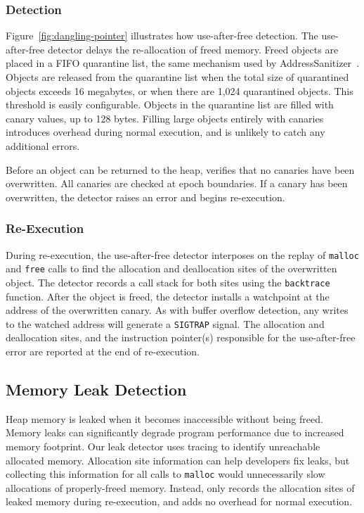 \subsubsection*{Detection}

Figure~\ref{fig:dangling-pointer} illustrates how use-after-free detection. The use-after-free detector delays the re-allocation of freed memory. Freed objects are placed in a FIFO quarantine list, the same mechanism used by AddressSanitizer~\cite{AddressSanitizer}. Objects are released from the quarantine list when the total size of quarantined objects exceeds 16 megabytes, or when there are 1,024 quarantined objects. This threshold is easily configurable. Objects in the quarantine list are filled with canary values, up to 128 bytes. Filling large objects entirely with canaries introduces overhead during normal execution, and is unlikely to catch any additional errors. 

Before an object can be returned to the heap, \doubletake{} verifies that no canaries have been overwritten. All canaries are checked at epoch boundaries. If a canary has been overwritten, the detector raises an error and begins re-execution.

\subsubsection*{Re-Execution}

During re-execution, the use-after-free detector interposes on the replay of \texttt{malloc} and \texttt{free} calls to find the allocation and deallocation sites of the overwritten object. The detector records a call stack for both sites using the \texttt{backtrace} function. After the object is freed, the detector installs a watchpoint at the address of the overwritten canary. As with buffer overflow detection, any writes to the watched address will generate a \texttt{SIGTRAP} signal. The allocation and deallocation sites, and the instruction pointer(s) responsible for the use-after-free error are reported at the end of re-execution.


\subsection{Memory Leak Detection}
\label{sec:applications/leak}
Heap memory is leaked when it becomes inaccessible without being freed. Memory leaks can significantly degrade program performance due to increased memory footprint. Our leak detector uses tracing to identify unreachable allocated memory. Allocation site information can help developers fix leaks, but collecting this information for all calls to \texttt{malloc} would unnecessarily slow allocations of properly-freed memory. Instead, \doubletake{} only records the allocation sites of leaked memory during re-execution, and adds no overhead for normal execution.

